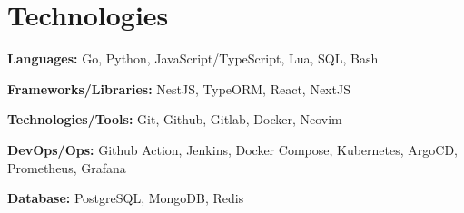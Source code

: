 \section{Technologies}

\begin{onecolentry}
	\textbf{Languages:}
	Go,
	Python,
	JavaScript/TypeScript,
	Lua,
	SQL,
	Bash
\end{onecolentry}

\vspace{0.2 cm}

\begin{onecolentry}
	\textbf{Frameworks/Libraries:}
	NestJS,
	TypeORM,
	React,
	NextJS
\end{onecolentry}

\vspace{0.2 cm}

\begin{onecolentry}
	\textbf{Technologies/Tools:}
	Git,
	Github,
	Gitlab,
	Docker,
	Neovim
\end{onecolentry}

\vspace{0.2 cm}

\begin{onecolentry}
	\textbf{DevOps/Ops:}
	Github Action,
	Jenkins,
	Docker Compose,
	Kubernetes,
	ArgoCD,
	Prometheus,
	Grafana
\end{onecolentry}

%
%
%

\vspace{0.2 cm}

\begin{onecolentry}
	\textbf{Database:}
	PostgreSQL,
	MongoDB,
	Redis
\end{onecolentry}
